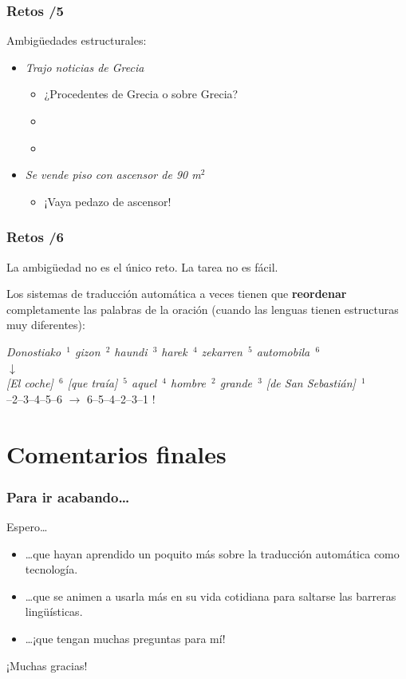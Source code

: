 \documentclass{beamer}
\begin{document}
\begin{frame}
  \frametitle{Retos /5}
  Ambigüedades estructurales:
  \begin{itemize}
  \item \emph{Trajo noticias de Grecia}\pause
    \begin{itemize}
    \item ¿Procedentes de Grecia o sobre Grecia?\pause
    \item \emph{}\pause
    \item \emph{ }\pause
    \end{itemize}
  \item \emph{Se vende piso con ascensor de 90 m$^2$}\pause
    \begin{itemize}
    \item ¡Vaya pedazo de ascensor!
    \end{itemize}
  \end{itemize}
\end{frame}

\begin{frame}
\frametitle{Retos /6}
La ambigüedad no es el único reto. La tarea no es fácil.\pause

Los sistemas de traducción automática a veces tienen que \textbf{reordenar} completamente las palabras de la oración (cuando las lenguas tienen estructuras muy diferentes):\pause
\begin{center}
  \emph{Donostiako\ $^1$ gizon\ $^2$ haundi\ $^3$ harek\ $^4$ zekarren\ $^5$ automobila\ $^6$} \\ \pause
  $\downarrow$
  \\
  \emph{[El coche]\ $^6$ [que traía]\ $^5$ aquel\ $^4$ hombre\ $^2$ grande\ $^3$ [de San Sebastián]\ $^1$} \\[1cm]--2--3--4--5--6 $\to$ 6--5--4--2--3--1 ! 
\end{center}
\end{frame}

\section{Comentarios finales}

\begin{frame}
\frametitle{Para ir acabando\ldots}

Espero\ldots\pause
\begin{itemize}
\item \ldots que hayan aprendido un poquito más sobre la traducción automática como tecnología.\pause
\item \ldots que se animen a usarla más en su vida cotidiana para saltarse las barreras lingüísticas.\pause
\item \ldots ¡que tengan muchas preguntas para mí!\pause
\end{itemize}
¡Muchas gracias!

\end{frame}
\end{document}
